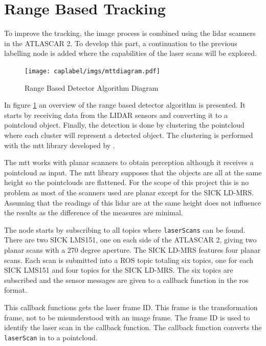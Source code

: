 \section{Range Based Tracking}

To improve the tracking, the image process is combined using the \gls{lidar} scanners in the ATLASCAR 2. To develop this part, a continuation to the previous labelling node is added where the capabilities of the laser scans will be explored. 


\begin{figure}
	
	\centering
	\texttt{[image: caplabel/imgs/mttdiagram.pdf]}
	
	\caption{Range Based Detector Algorithm Diagram}
	\label{fig:mttdiagram}
	
\end{figure}

In figure \ref{fig:mttdiagram} an overview of the range based detector algorithm is presented. It starts by receiving data from the LIDAR sensors and converting it to a pointcloud object. Finally, the detection is done by clustering the pointcloud where each cluster will represent a detected object. The clustering is performed with the \gls{mtt} library developed by \cite{SoaresDeAlmeida2016a}. 

The \gls{mtt} works with planar scanners to obtain perception although it receives a pointcloud as input. The \gls{mtt} library supposes that the objects are all at the same height so the pointclouds are flattened. For the scope of this project this is no problem as most of the scanners used are planar except for the SICK LD-MRS. Assuming that the readings of this \gls{lidar} are at the same height does not influence the results as the difference of the measures are minimal. 

The node starts by subscribing to all topics where \texttt{laserScans} can be found. There are two SICK LMS151, one on each side of the ATLASCAR 2, giving two planar scans with a 270 degree aperture. The SICK LD-MRS features four planar scans. Each scan is submitted into a ROS topic totaling six topics, one for each SICK LMS151 and four topics for the SICK LD-MRS. The six topics are subscribed and the sensor messages are given to a callback function in the \gls{ros} format.

This callback functions gets the laser frame ID. This frame is the transformation frame, not to be misunderstood with an image frame. The frame ID is used to identify the laser scan in the callback function. The callback function converts the \texttt{laserScan} in to a pointcloud.

